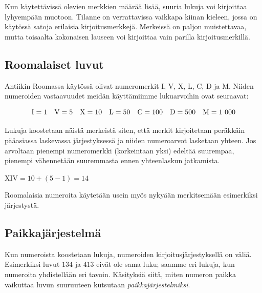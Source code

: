 Kun käytettävissä olevien merkkien määrää lisää, suuria lukuja voi kirjoittaa lyhyempään muotoon. Tilanne on verrattavissa vaikkapa kiinan kieleen, jossa on käytössä satoja erilaisia kirjoitusmerkkejä. Merkeissä on paljon muistettavaa, mutta toisaalta kokonaisen lauseen voi kirjoittaa vain parilla kirjoitusmerkillä.




\subsection*{Roomalaiset luvut}
Antiikin Roomassa käytössä olivat numeromerkit I, V, X, L, C, D ja M. Niiden numeroiden vastaavuudet meidän käyttämiimme lukuarvoihin ovat seuraavat:

\begin{equation*}
\rm I=1\quad
V=5\quad
X=10\quad
L=50\quad
C=100\quad
D=500\quad
M=1~000
\end{equation*}


Lukuja koostetaan näistä merkeistä siten, että merkit kirjoitetaan peräkkäin pääasiassa laskevassa järjestyksessä ja niiden numeroarvot lasketaan yhteen. Jos arvoltaan pienempi numeromerkki (korkeintaan yksi) edeltää suurempaa, pienempi vähennetään suuremmasta ennen yhteenlaskun jatkamista.

\begin{esimerkki}
$\text{XIV} = 10 + (5 - 1) = 14$
\end{esimerkki}

Roomalaisia numeroita käytetään usein myös nykyään merkitsemään esimerkiksi järjestystä.

\subsection*{Paikkajärjestelmä}

Kun numeroista koostetaan lukuja, numeroiden kirjoitusjärjestyksellä on väliä. Esimerkiksi luvut $134$ ja $413$ eivät ole sama luku; saamme eri lukuja, kun numeroita yhdistellään eri tavoin. Käsityksiä siitä, miten numeron paikka vaikuttaa luvun suuruuteen kutsutaan \emph{paikkajärjestelmiksi}.

